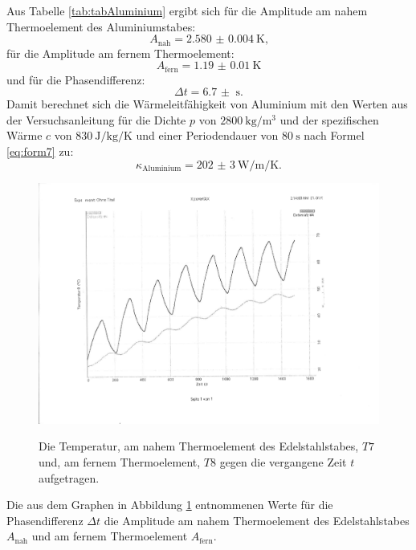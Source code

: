 Aus Tabelle \ref{tab:tabAluminium} ergibt sich für die Amplitude am nahem Thermoelement des Aluminiumstabes:
\begin{displaymath}
A_\text{nah} = \SI{2.580(4)}{\kelvin}\text{,}
\end{displaymath}
für die Amplitude am fernem Thermoelement:
\begin{displaymath}
A_\text{fern} = \SI{1.19(1)}{\kelvin}
\end{displaymath}
und für die Phasendifferenz:
\begin{displaymath}
\Delta t = \SI{6.7(0)}{\second}\text{.}
\end{displaymath}
Damit berechnet sich die Wärmeleitfähigkeit von Aluminium mit den Werten aus der Versuchsanleitung \cite{V204} für die Dichte $p$ von $\SI{2800}{\kilo\gram\per\meter\tothe{3}}$ und der spezifischen Wärme $c$ von $\SI{830}{\joule\per\kilo\gram\per\kelvin}$ und einer Periodendauer von $\SI{80}{\second}$ nach Formel \eqref{eq:form7} zu:
\begin{displaymath}
\kappa_\text{Aluminium} = \SI{202(3)}{\watt\per\meter\per\kelvin}\text{.}
\end{displaymath}
\begin{figure}
	\centering
	\caption{Die Temperatur, am nahem Thermoelement des Edelstahlstabes, $T7$ und, am fernem Thermoelement, $T8$ gegen die vergangene Zeit $t$ aufgetragen.}
	\includegraphics[width=\linewidth-70pt,height=\textheight-70pt,keepaspectratio]{content/Bilder/T7T8-rotated.pdf}
	\label{fig:Graph7}
\end{figure}
\begin{table}
	\centering
	\caption{Die aus dem Graphen in Abbildung \ref{fig:Graph7} entnommenen Werte für die Phasendifferenz $\Delta t$ die Amplitude am nahem Thermoelement des Edelstahlstabes $A_\text{nah}$ und am fernem Thermoelement $A_\text{fern}$.}
	
\end{table}

